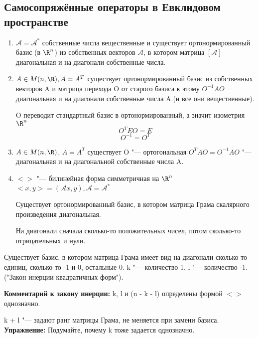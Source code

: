 \subsection{ Самосопряжённые операторы в Евклидовом пространстве}
\begin{enumerate}
    \item $\mathscr{A} = \mathscr{A}^*$ собственные числа вещественные и существует 
    ортонормированный базис (в $\R^n$) из  собственных векторов $\mathscr{A}$, в котором матрица $[\mathscr{A}]$ диагональная 
    и на диагонали собственные числа. 
    \item 
    $A \in M(n, \R), A = A^{T}$ существует ортонормированный базис из
    собственных векторов A и матрица перехода O от старого базиса к этому 
    $O^{-1}AO = $ диагональная и на диагонали собственные числа A.(и все они вещественные).

    O переводит стандартный базис в ортонормированный, а значит изометрия $\R^n$
    $$O^T E O = E$$
    $$O^{-1} = O^T$$
    \item $A \in M(n,\R)$, $A = A^T$ существует O "--- ортогональная 
    $O^{T}AO = O^{-1}AO$ "--- диагональная и на диагональной собственные числа A.
    \item 
    $<>$ "--- билинейная форма симметричная на $\R^n$
    $<x, y> = (\mathscr{A}x, y), \mathscr{A} = \mathscr{A}^*$

    Существует ортонормированный базис, в котором матрица Грама скалярного произведения диагональная. 

    На диагонали сначала сколько-то положительных чисел, потом сколько-то отрицательных и нули. 
\end{enumerate}
    \begin{conseq}
     Существует базис, в котором матрица Грама имеет вид
     на диагонали сколько-то единиц, сколько-то -1 и 0, остальные 0.
     k "--- количество 1, l "--- количество -1.
     ("Закон инерции квадратичных форм"). 
    \end{conseq}

    \textbf{Комментарий к закону инерции:}
    k, l и (n - k - l) определены формой $<>$ однозначно. 
    
    k + l "--- задают ранг матрицы Грама, не меняется при замени базиса.  
    \textbf{Упражнение:} Подумайте, почему k тоже задается однозначно. 

